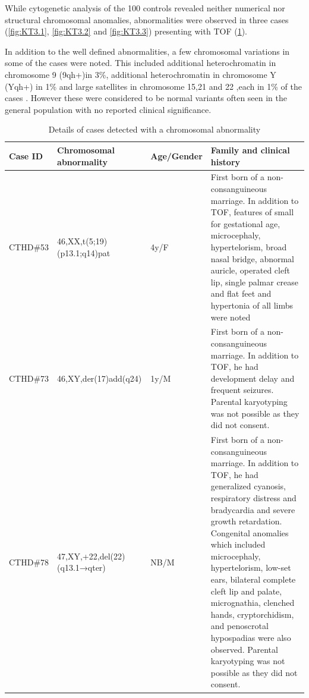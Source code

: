 \begin{refsection}
While cytogenetic analysis of the 100 controls revealed neither numerical nor structural chromosomal anomalies, abnormalities were observed in three cases (\cref{fig:KT3.1}, \cref{fig:KT3.2} and \cref{fig:KT3.3}) presenting with TOF (\cref{tab:3.1abnormalkt}).

In addition to the well defined abnormalities, a few chromosomal variations in some of the cases were noted. This included additional heterochromatin in chromosome 9 (9qh+)in 3\%, additional heterochromatin in chromosome Y (Yqh+) in 1\% and large satellites in chromosome 15,21 and 22 ,each in 1\% of the cases . However these were considered to be normal variants often seen in the general population with no reported clinical significance.

\begin{landscape}
\begin{table}[!p]
\centering
\caption{Details of cases detected with a chromosomal abnormality}
\label{tab:3.1abnormalkt}
\begin{tabular}{p{0.75in}  p{2.15in}  p{0.75in}  p{5in}  }
\hline
	Case ID & Chromosomal abnormality &  Age/Gender &  Family and clinical history \\ \hline
	CTHD\#53 & 46,XX,t(5;19)(p13.1;q14)pat & 4y/F & First born of a non-consanguineous marriage. In addition to TOF, features of small for gestational age, microcephaly, hypertelorism, broad nasal bridge, abnormal auricle, operated cleft lip, single palmar crease and flat feet and hypertonia of all limbs were noted   \\ \hline
	CTHD\#73 & 46,XY,der(17)add(q24) & 1y/M & First born of a non-consanguineous marriage. In addition to TOF, he had development delay and frequent seizures. Parental karyotyping was not possible as they did not consent. \\ \hline
	CTHD\#78 & 47,XY,+22,del(22)(q13.1→qter) & NB/M & First born of a non-consanguineous marriage. In addition to TOF, he had generalized cyanosis, respiratory distress and bradycardia and severe growth retardation. Congenital anomalies which included microcephaly, hypertelorism, low-set ears, bilateral complete cleft lip and palate, micrognathia, clenched hands, cryptorchidism, and penoscrotal hypospadias were also observed. Parental karyotyping was not possible as they did not consent. \\ \hline
	
\end{tabular}
\end{table}
\end{landscape}


\end{refsection}
